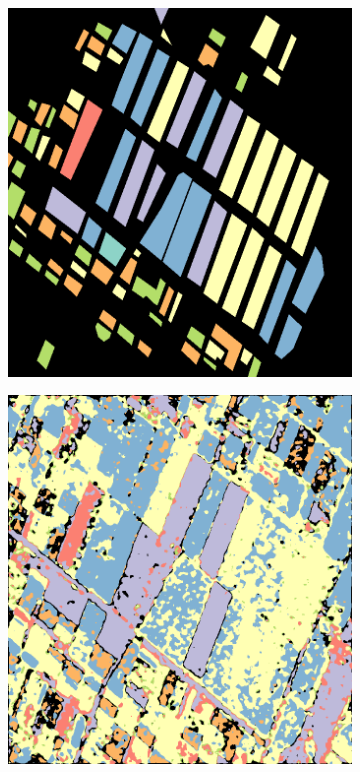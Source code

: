 \begin{figure}[tbp]
\centering
    \begin{subfigure}[b]{0.45\textwidth}
        \includegraphics[width=\textwidth]{Figures/Kron/Validation_COLOUR}
        \caption{}
        \label{fig:Training}
    \end{subfigure}
     \begin{subfigure}[b]{0.45\textwidth}
        \includegraphics[width=\textwidth]{Figures/Kron/C_COLOUR}

\end{subfigure}
\end{figure}
